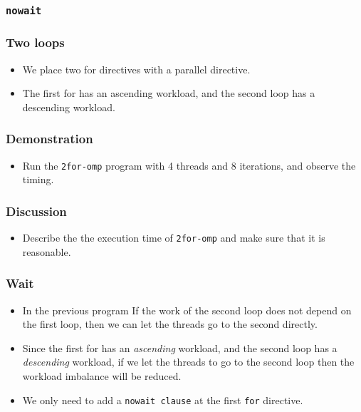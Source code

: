 \documentclass{beamer}
\begin{document}
\begin{frame}
\frametitle{\tt nowait}
\end{frame}

\begin{frame}
\frametitle{Two loops}
\begin{itemize}
\item We place two for directives with a parallel directive.
\item The first for has an ascending workload, and the second loop has
a descending workload. 
\end{itemize}
\end{frame}


\begin{frame}
  \frametitle{Demonstration}
  \begin{itemize}
  \item Run the {\tt 2for-omp} program with 4 threads and 8
    iterations, and observe the timing.
  \end{itemize}
\end{frame}

\begin{frame}
  \frametitle{Discussion}
  \begin{itemize}
  \item Describe the the execution time of {\tt 2for-omp} and make
    sure that it is reasonable.
  \end{itemize}
\end{frame}

\begin{frame}
\frametitle{Wait}
\begin{itemize}
\item In the previous program If the work of the second loop does not
  depend on the first loop, then we can let the threads go to the
  second directly.
\item Since the first for has an {\em ascending} workload, and the
  second loop has a {\em descending} workload, if we let the threads
  to go to the second loop then the workload imbalance will be
  reduced.
\item We only need to add a {\tt nowait clause} at the first {\tt for}
  directive.
\end{itemize}
\end{frame}

\begin{frame}
\end{frame}
\end{document}
